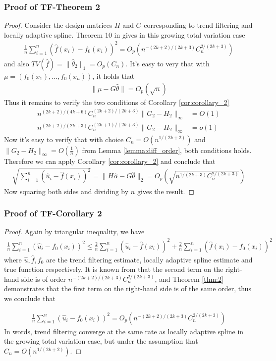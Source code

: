 \documentclass[a4paper]{article}
\begin{document}
\subsubsection{Proof of TF-Theorem 2}
\begin{proof}
Consider the design matrices $H$ and $G$ corresponding to trend filtering and locally adaptive spline. Theorem 10 in \cite{mammen1997locally} gives in this growing total variation case
\begin{align*}
\frac{1}{n}\sum_{i=1}^n(\hat{f}(x_i) - f_0(x_i))^2 = O_p(n^{-(2k+2)/(2k+3)}C_n^{2/(2k+3)})
\end{align*}
and also $TV(\hat{f}) = \|\hat{\theta}_2\|_1 = O_p(C_n)$. It's easy to very that with $\mu = (f_0(x_1),\ldots, f_0(x_n))$, it holds that
\begin{align*}
\|\mu-G\hat{\theta}\| = O_p(\sqrt{n})
\end{align*}
Thus it remains to verify the two conditions of Corollary \ref{cor:corollary_2}
\begin{align*}
n^{(2k+2)/(4k+6)}C_n^{(2k+2)/(2k+3)}\|G_2-H_2\|_\infty &= O(1)\\
n^{(2k+2)/(2k+3)}C_n^{(2k+1)/(2k+3)}\|G_2-H_2\|_\infty &= o(1)
\end{align*}
Now it's easy to verify that with choice $C_n = O(n^{1/(2k+2)})$ and $\|G_2-H_2\|_\infty = O(\frac{1}{n})$ from Lemma \ref{lemma:diff_order}, both conditions holds. Therefore we can apply Corollary \ref{cor:corollary_2} and conclude that 
\begin{align*}
\sqrt{\sum_{i=1}^n(\hat{u}_i - \hat{f}(x_i))^2} = \|H\hat{\alpha} - G\hat{\theta}\|_2 = O_p(\sqrt{n^{1/(2k+3)}C_n^{2/(2k+3)}})
\end{align*}
Now squaring both sides and dividing by $n$ gives the result.
\end{proof}

\subsubsection{Proof of TF-Corollary 2}
\begin{proof}
Again by triangular inequality, we have
\begin{align*}
\frac{1}{n}\sum_{i=1}^n(\hat{u}_i - f_0(x_i))^2 \leq \frac{2}{n}\sum_{i=1}^n(\hat{u}_i - \hat{f}(x_i))^2 + \frac{2}{n}\sum_{i=1}^n (\hat{f}(x_i) - f_0(x_i))^2
\end{align*}
where $\hat{u}, \hat{f}, f_0$ are the trend filtering estimate, locally adaptive spline estimate and true function respectively. It is known from \cite{mammen1997locally} that the second term on the right-hand side is of order $n^{-(2k+2)/(2k+3)}C_n^{2/(2k+3)}$, and Theorem \ref{thm:2} demonstrates that the first term on the right-hand side is of the same order, thus we conclude that

\begin{align*}
\frac{1}{n}\sum_{i=1}^n(\hat{u}_i - f_0(x_i))^2 = O_p(n^{-(2k+2)/(2k+3)}C_n^{2/(2k+3)})
\end{align*}
In words, trend filtering converge at the same rate as locally adaptive spline in the growing total variation case, but under the assumption that $C_n = O(n^{1/(2k+2)})$.
\end{proof}
\end{document}
